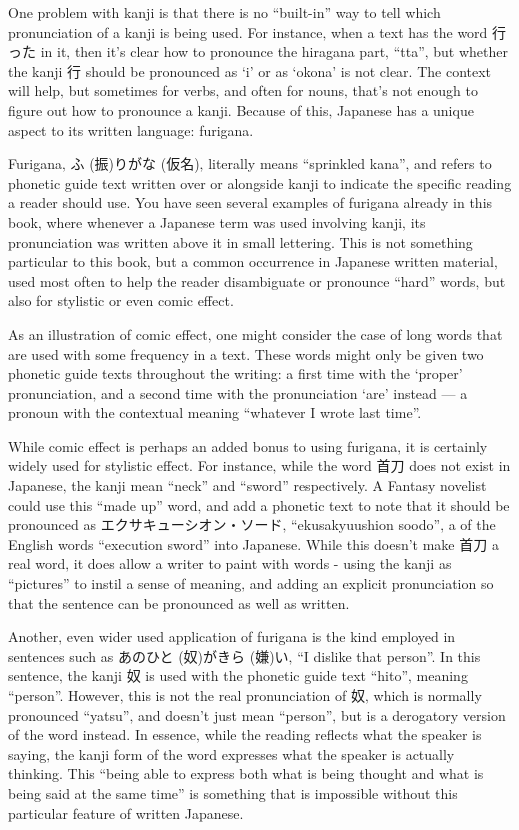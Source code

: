 \documentclass[11pt, b5paper, twoside, openright, onecolumn]{book}
\makeatletter
\newcommand*{\rubystack}[2]{{\relscale{0.5}%
  \begin{tabular}[b]{@{}c@{}}%
    {#1}\\%
   {\textscale{2}{#2}}%
  \end{tabular}}%
}
\DeclareRobustCommand*{\ruby}[2]{%
  \mbox{%
    \setlength{\parskip}{0ex}%
    \BeginAccSupp{method=pdfstringdef,ActualText={#1}}%
      \rubystack{\phantom{#2}}{#1}%
      \llap{%
        \rubystack{#2}{\phantom{#1}}%
      }%
    \EndAccSupp{}%
  }%
}
\renewcommand*{\ruby}[2]{#2 (#1)}%
\makeatother
\begin{document}
One problem with kanji is that there is no “built-in” way to tell which pronunciation of a kanji is being used. For instance‚ when a text has the word 行った in it‚ then it’s clear how to pronounce the hiragana part‚ “tta”‚ but whether the kanji 行 should be pronounced as ‘i’ or as ‘okona’ is not clear. The context will help‚ but sometimes for verbs‚ and often for nouns‚ that’s not enough to figure out how to pronounce a kanji. Because of this‚ Japanese has a unique aspect to its written language: furigana.

Furigana‚ \ruby{振}{ふ}り\ruby{仮名}{がな}‚ literally means “sprinkled kana”‚ and refers to phonetic guide text written over or alongside kanji to indicate the specific reading a reader should use. You have seen several examples of furigana already in this book‚ where whenever a Japanese term was used involving kanji‚ its pronunciation was written above it in small lettering. This is not something particular to this book‚ but a common occurrence in Japanese written material‚ used most often to help the reader disambiguate or pronounce “hard” words‚ but also for stylistic or even comic effect.

As an illustration of comic effect‚ one might consider the case of long words that are used with some frequency in a text. These words might only be given two phonetic guide texts throughout the writing: a first time with the ‘proper’ pronunciation‚ and a second time with the pronunciation ‘are’ instead — a pronoun with the contextual meaning “whatever I wrote last time”.

While comic effect is perhaps an added bonus to using furigana‚ it is certainly widely used for stylistic effect. For instance‚ while the word 首刀 does not exist in Japanese‚ the kanji mean “neck” and “sword” respectively. A Fantasy novelist could use this “made up” word‚ and add a phonetic text to note that it should be pronounced as エクサキューシオン・ソード‚ “ekusakyuushion soodo”‚ a  of the English words “execution sword” into Japanese. While this doesn’t make 首刀 a real word‚ it does allow a writer to paint with words - using the kanji as “pictures” to instil a sense of meaning‚ and adding an explicit pronunciation so that the sentence can be pronounced as well as written.

Another‚ even wider used application of furigana is the kind employed in sentences such as あの\ruby{奴}{ひと}が\ruby{嫌}{きら}い‚ “I dislike that person”. In this sentence‚ the kanji 奴 is used with the phonetic guide text “hito”‚ meaning “person”. However‚ this is not the real pronunciation of 奴‚ which is normally pronounced “yatsu”‚ and doesn’t just mean “person”‚ but is a derogatory version of the word instead. In essence‚ while the reading reflects what the speaker is saying‚ the kanji form of the word expresses what the speaker is actually thinking. This “being able to express both what is being thought and what is being said at the same time” is something that is impossible without this particular feature of written Japanese.
\end{document}
